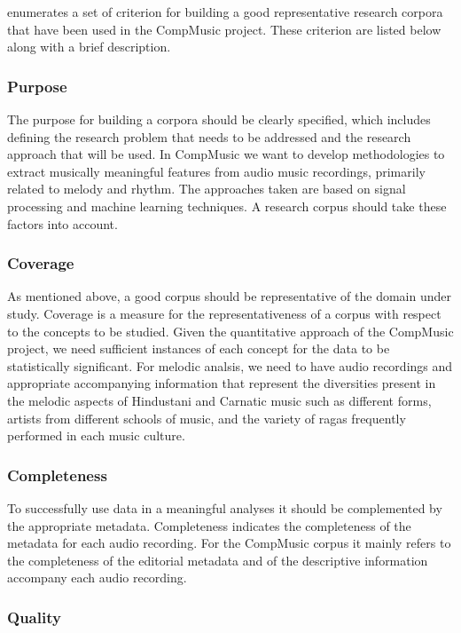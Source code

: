 \cite{serra:14:corpus} enumerates a set of criterion for building a good representative research corpora that have been used in the CompMusic project. These criterion are listed below along with a brief description.

\subsubsection{Purpose}

The purpose for building a corpora should be clearly specified, which includes defining the research problem that needs to be addressed and the research approach that will be used. In CompMusic we want to develop methodologies to extract musically meaningful features from audio music recordings, primarily related to melody and rhythm. The approaches taken are based on signal processing and machine learning techniques. A research corpus should take these factors into account.

\subsubsection{Coverage}

As mentioned above, a good corpus should be representative of the domain under study. Coverage is a measure for the representativeness of a corpus with respect to the concepts to be studied. Given the quantitative approach of the CompMusic project, we need sufficient instances of each concept for the data to be statistically significant. For melodic analsis, we need to have audio recordings and appropriate accompanying information that represent the diversities present in the melodic aspects of Hindustani and Carnatic music such as different forms, artists from different schools of music, and the variety of \glspl{raga} frequently performed in each music culture. 

\subsubsection{Completeness}

To successfully use data in a meaningful analyses it should be complemented by the appropriate metadata. Completeness indicates the completeness of the metadata for each audio recording. For the CompMusic corpus it mainly refers to the completeness of the editorial metadata and of the descriptive information accompany each audio recording. 

\subsubsection{Quality}

